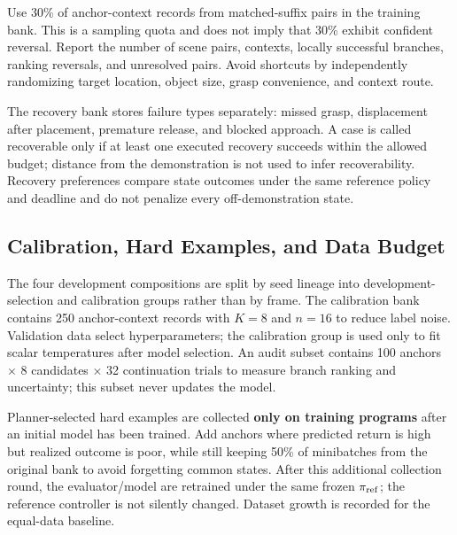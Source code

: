 \documentclass[
  10pt,
]{article}
\begin{document}
Use 30\% of anchor-context records from matched-suffix pairs in the training bank. This is a sampling quota and does not imply that 30\% exhibit confident reversal. Report the number of scene pairs, contexts, locally successful branches, ranking reversals, and unresolved pairs. Avoid shortcuts by independently randomizing target location, object size, grasp convenience, and context route.

The recovery bank stores failure types separately: missed grasp, displacement after placement, premature release, and blocked approach. A case is called recoverable only if at least one executed recovery succeeds within the allowed budget; distance from the demonstration is not used to infer recoverability. Recovery preferences compare state outcomes under the same reference policy and deadline and do not penalize every off-demonstration state.

\hypertarget{calibration-hard-examples-vuxe0-nguxe2n-suxe1ch-dux1eef-liux1ec7u}{%
\subsection{Calibration, Hard Examples, and Data Budget}\label{calibration-hard-examples-vuxe0-nguxe2n-suxe1ch-dux1eef-liux1ec7u}}

The four development compositions are split by seed lineage into development-selection and calibration groups rather than by frame. The calibration bank contains 250 anchor-context records with \(K=8\) and \(n=16\) to reduce label noise. Validation data select hyperparameters; the calibration group is used only to fit scalar temperatures after model selection. An audit subset contains 100 anchors \(\times\) 8 candidates \(\times\) 32 continuation trials to measure branch ranking and uncertainty; this subset never updates the model.

Planner-selected hard examples are collected \textbf{only on training programs} after an initial model has been trained. Add anchors where predicted return is high but realized outcome is poor, while still keeping 50\% of minibatches from the original bank to avoid forgetting common states. After this additional collection round, the evaluator/model are retrained under the same frozen \(\pi_{\rm ref}\); the reference controller is not silently changed. Dataset growth is recorded for the equal-data baseline.
\end{document}
